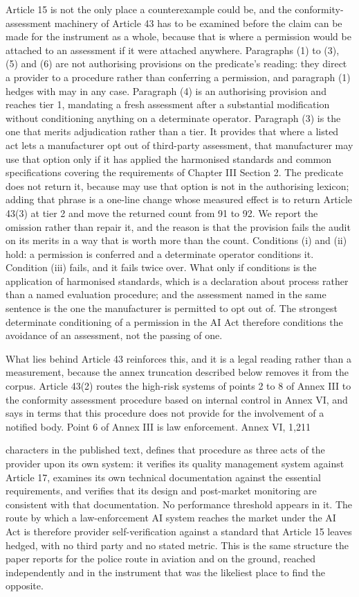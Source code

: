 Article 15 is not the only place a counterexample could be, and the conformity-assessment machinery of Article 43 has to be examined before the claim can be made for the instrument as a whole, because that is where a permission would be attached to an assessment if it were attached anywhere. Paragraphs (1) to (3), (5) and (6) are not authorising provisions on the predicate's reading: they direct a provider to a procedure rather than conferring a permission, and paragraph (1) hedges with may in any case. Paragraph (4) is an authorising provision and reaches tier 1, mandating a fresh assessment after a substantial modification without conditioning anything on a determinate operator. Paragraph (3) is the one that merits adjudication rather than a tier. It provides that where a listed act lets a manufacturer opt out of third-party assessment, that manufacturer may use that option only if it has applied the harmonised standards and common specifications covering the requirements of Chapter III Section 2. The predicate does not return it, because may use that option is not in the authorising lexicon; adding that phrase is a one-line change whose measured effect is to return Article 43(3) at tier 2 and move the returned count from 91 to 92. We report the omission rather than repair it, and the reason is that the provision fails the audit on its merits in a way that is worth more than the count. Conditions (i) and (ii) hold: a permission is conferred and a determinate operator conditions it. Condition (iii) fails, and it fails twice over. What only if conditions is the application of harmonised standards, which is a declaration about process rather than a named evaluation procedure; and the assessment named in the same sentence is the one the manufacturer is permitted to opt out of. The strongest determinate conditioning of a permission in the AI Act therefore conditions the avoidance of an assessment, not the passing of one.

What lies behind Article 43 reinforces this, and it is a legal reading rather than a measurement, because the annex truncation described below removes it from the corpus. Article 43(2) routes the high-risk systems of points 2 to 8 of Annex III to the conformity assessment procedure based on internal control in Annex VI, and says in terms that this procedure does not provide for the involvement of a notified body. Point 6 of Annex III is law enforcement. Annex VI, 1,211

characters in the published text, defines that procedure as three acts of the provider upon its own system: it verifies its quality management system against Article 17, examines its own technical documentation against the essential requirements, and verifies that its design and post-market monitoring are consistent with that documentation. No performance threshold appears in it. The route by which a law-enforcement AI system reaches the market under the AI Act is therefore provider self-verification against a standard that Article 15 leaves hedged, with no third party and no stated metric. This is the same structure the paper reports for the police route in aviation and on the ground, reached independently and in the instrument that was the likeliest place to find the opposite.

